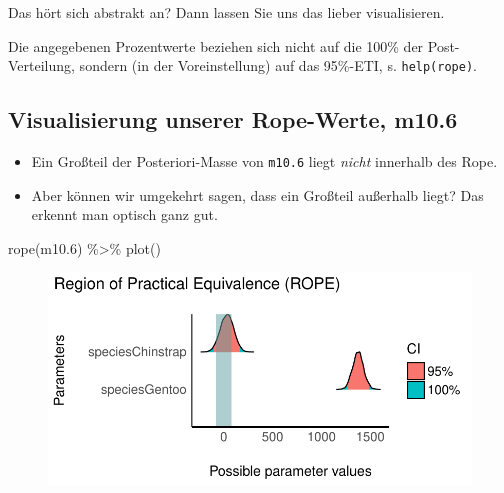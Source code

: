 \documentclass[
  a4paper,
  DIV=11]{scrreprt}
\newenvironment{Shaded}{\begin{snugshade}}{\end{snugshade}}
\newcommand{\FloatTok}[1]{\textcolor[rgb]{0.68,0.00,0.00}{#1}}
\newcommand{\FunctionTok}[1]{\textcolor[rgb]{0.28,0.35,0.67}{#1}}
\newcommand{\NormalTok}[1]{\textcolor[rgb]{0.00,0.23,0.31}{#1}}
\newcommand{\SpecialCharTok}[1]{\textcolor[rgb]{0.37,0.37,0.37}{#1}}
\providecommand{\tightlist}{%
  \setlength{\itemsep}{0pt}\setlength{\parskip}{0pt}}\usepackage{longtable,booktabs,array}
\theoremstyle{definition}
\theoremstyle{remark}
\begin{document}
Das hört sich abstrakt an? Dann lassen Sie uns das lieber visualisieren.

\begin{tcolorbox}[enhanced jigsaw, title=\textcolor{quarto-callout-note-color}{\faInfo}\hspace{0.5em}{Hinweis}, bottomtitle=1mm, bottomrule=.15mm, titlerule=0mm, colbacktitle=quarto-callout-note-color!10!white, colframe=quarto-callout-note-color-frame, leftrule=.75mm, left=2mm, toprule=.15mm, colback=white, arc=.35mm, breakable, toptitle=1mm, opacityback=0, rightrule=.15mm, coltitle=black, opacitybacktitle=0.6]

Die angegebenen Prozentwerte beziehen sich nicht auf die 100\% der
Post-Verteilung, sondern (in der Voreinstellung) auf das 95\%-ETI, s.
\texttt{help(rope)}.

\end{tcolorbox}

\hypertarget{visualisierung-unserer-rope-werte-m10.6}{%
\subsection{Visualisierung unserer Rope-Werte,
m10.6}\label{visualisierung-unserer-rope-werte-m10.6}}

\begin{itemize}
\tightlist
\item
  Ein Großteil der Posteriori-Masse von \texttt{m10.6} liegt
  \emph{nicht} innerhalb des Rope.
\item
  Aber können wir umgekehrt sagen, dass ein Großteil außerhalb liegt?
  Das erkennt man optisch ganz gut.
\end{itemize}

\begin{Shaded}
\begin{Highlighting}[]
\FunctionTok{rope}\NormalTok{(m10}\FloatTok{.6}\NormalTok{) }\SpecialCharTok{\%\textgreater{}\%} \FunctionTok{plot}\NormalTok{()}
\end{Highlighting}
\end{Shaded}

\begin{figure}[H]

{\centering \includegraphics{./metrische-AV_files/figure-pdf/unnamed-chunk-37-1.pdf}

}

\end{figure}
\end{document}
